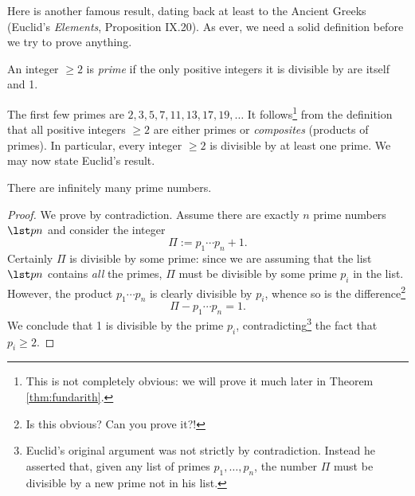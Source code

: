 Here is another famous result, dating back at least to the Ancient Greeks (Euclid's \emph{Elements}, Proposition IX.20). As ever, we need a solid definition before we try to prove anything.

\begin{defn}\label{defn:irreducible}
An integer $\ge 2$ is \emph{prime} if the only positive integers it is divisible by are itself and 1.
\end{defn}

\noindent The first few primes are $2,3,5,7,11,13,17,19,\ldots$ It follows\footnote{This is not completely obvious: we will prove it much later in Theorem \ref{thm:fundarith}.} from the definition that all positive integers $\ge 2$ are either primes or \emph{composites} (products of primes). In particular, every integer $\ge 2$ is divisible by at least one prime. We may now state Euclid's result.

\begin{thm}
There are infinitely many prime numbers.
\end{thm}

\begin{proof}
We prove by contradiction. Assume there are exactly $n$ prime numbers $\lst p n$ and consider the integer
\[\Pi:=p_1\cdots p_n+1.\]
Certainly $\Pi$ is divisible by some prime: since we are assuming that the list $\lst pn$ contains \emph{all} the primes, $\Pi$ must be divisible by some prime $p_i$ in the list. However, the product $p_1\cdots p_n$ is clearly divisible by $p_i$, whence so is the difference\footnote{Is this obvious? Can you prove it?!}
\[\Pi-p_1\cdots p_n=1.\]
We conclude that 1 is divisible by the prime $p_i$, contradicting\footnote{Euclid's original argument was not strictly by contradiction. Instead he asserted that, given any list of primes $p_1,\ldots,p_n$, the number $\Pi$ must be divisible by a new prime not in his list.} the fact that $p_i\ge 2$.
\end{proof}







